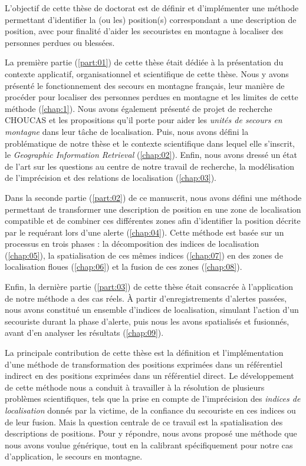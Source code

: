 
L'objectif de cette thèse de doctorat est de définir et d'implémenter
une méthode permettant d'identifier la (ou les) position(s)
correspondant a une description de position, avec pour finalité
d'aider les secouristes en montagne à localiser des personnes perdues
ou blessées.

La première partie (\ref{part:01}) de cette thèse était dédiée à la
présentation du contexte applicatif, organisationnel et scientifique
de cette thèse. Nous y avons présenté le fonctionnement des secours en
montagne français, leur manière de procéder pour localiser des
personnes perdues en montagne et les limites de cette méthode
(\autoref{chap:1}). Nous avons également présenté de projet de
recherche CHOUCAS et les propositions qu'il porte pour aider les
\emph{unités de secours en montagne} dans leur tâche de
localisation. Puis, nous avons défini la problématique de notre thèse
et le contexte scientifique dans lequel elle s'inscrit, le
\emph{Geographic Information Retrieval} (\autoref{chap:02}). Enfin,
nous avons dressé un état de l'art sur les questions au centre de
notre travail de recherche, la modélisation de l'imprécision et des
relations de localisation (\autoref{chap:03}).

Dans la seconde partie (\ref{part:02}) de ce manuscrit, nous avons
défini une méthode permettant de transformer une description de
position en une zone de localisation compatible et de combiner ces
différentes zones afin d’identifier la position décrite par le
requérant lors d'une alerte (\autoref{chap:04}). Cette méthode est
basée sur un processus en trois phases : la décomposition des indices
de localisation (\autoref{chap:05}), la spatialisation de ces mêmes
indices (\autoref{chap:07}) en des zones de localisation floues
(\autoref{chap:06}) et la fusion de ces zones (\autoref{chap:08}).

Enfin, la dernière partie (\ref{part:03}) de cette thèse était
consacrée à l’application de notre méthode a des cas réels. À partir
d'enregistrements d'alertes passées, nous avons constitué un ensemble
d'indices de localisation, simulant l'action d'un secouriste durant la
phase d'alerte, puis nous les avons spatialisés et fusionnés, avant
d'en analyser les résultats (\autoref{chap:09}).


La principale contribution de cette thèse est la définition et
l'implémentation d'une méthode de transformation des positions
exprimées dans un référentiel indirect en des positions exprimées dans
un référentiel direct. Le développement de cette méthode nous a
conduit à travailler à la résolution de plusieurs problèmes
scientifiques, tels que la prise en compte de l'imprécision des
\emph{indices de localisation} donnés par la victime, de la confiance
du secouriste en ces indices ou de leur fusion. Mais la question
centrale de ce travail est la spatialisation des descriptions de
positions. Pour y répondre, nous avons proposé une méthode que nous
avons voulue générique, tout en la calibrant spécifiquement pour notre
cas d’application, le secours en montagne.

